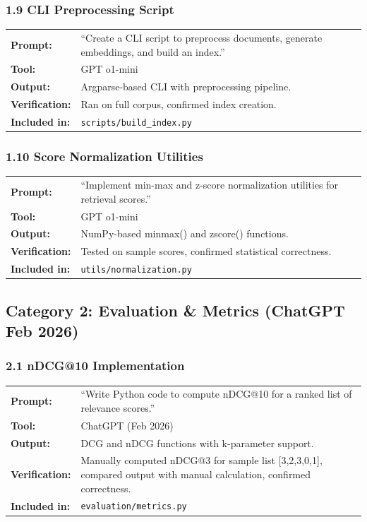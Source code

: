 \documentclass[12pt,a4paper]{article}
\begin{document}
\subsubsection*{1.9 CLI Preprocessing Script}
\begin{tabular}{p{3.2cm}p{9.5cm}}
\textbf{Prompt:}        & ``Create a CLI script to preprocess documents, generate embeddings, and build an index.'' \\
\textbf{Tool:}          & GPT o1-mini \\
\textbf{Output:}        & Argparse-based CLI with preprocessing pipeline. \\
\textbf{Verification:}  & Ran on full corpus, confirmed index creation. \\
\textbf{Included in:}   & \texttt{scripts/build\_index.py} \\
\end{tabular}

\subsubsection*{1.10 Score Normalization Utilities}
\begin{tabular}{p{3.2cm}p{9.5cm}}
\textbf{Prompt:}        & ``Implement min-max and z-score normalization utilities for retrieval scores.'' \\
\textbf{Tool:}          & GPT o1-mini \\
\textbf{Output:}        & NumPy-based minmax() and zscore() functions. \\
\textbf{Verification:}  & Tested on sample scores, confirmed statistical correctness. \\
\textbf{Included in:}   & \texttt{utils/normalization.py} \\
\end{tabular}

\subsection*{Category 2: Evaluation \& Metrics (ChatGPT Feb 2026)}

\subsubsection*{2.1 nDCG@10 Implementation}
\begin{tabular}{p{3.2cm}p{9.5cm}}
\textbf{Prompt:}        & ``Write Python code to compute nDCG@10 for a ranked list of relevance scores.'' \\
\textbf{Tool:}          & ChatGPT (Feb 2026) \\
\textbf{Output:}        & DCG and nDCG functions with k-parameter support. \\
\textbf{Verification:}  & Manually computed nDCG@3 for sample list [3,2,3,0,1], compared output with manual calculation, confirmed correctness. \\
\textbf{Included in:}   & \texttt{evaluation/metrics.py} \\
\end{tabular}
\end{document}
